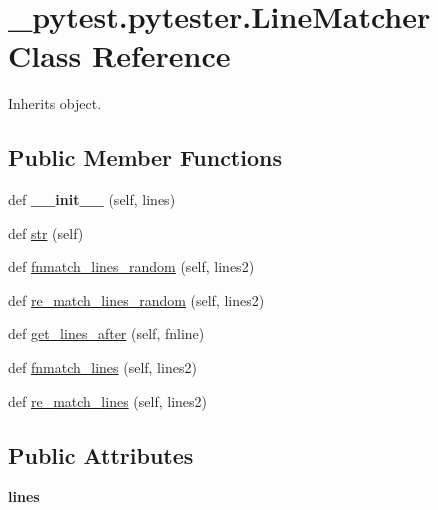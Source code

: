 \hypertarget{class__pytest_1_1pytester_1_1_line_matcher}{}\section{\+\_\+pytest.\+pytester.\+Line\+Matcher Class Reference}
\label{class__pytest_1_1pytester_1_1_line_matcher}


Inherits object.

\subsection*{Public Member Functions}
\begin{DoxyCompactItemize}
\item 
\mbox{\label{class__pytest_1_1pytester_1_1_line_matcher_ab7cbaaa0454579bf7e06a7a2b55272c2}} 
def {\bfseries \+\_\+\+\_\+init\+\_\+\+\_\+} (self, lines)
\item 
def \hyperlink{class__pytest_1_1pytester_1_1_line_matcher_ad1ec0a52963a0ebf982d5a2ff1e8856b}{str} (self)
\item 
def \hyperlink{class__pytest_1_1pytester_1_1_line_matcher_a77606dd9fd900b4863c766c5f640ba27}{fnmatch\+\_\+lines\+\_\+random} (self, lines2)
\item 
def \hyperlink{class__pytest_1_1pytester_1_1_line_matcher_a7cb3221f2ab7309da2342bb23257fc46}{re\+\_\+match\+\_\+lines\+\_\+random} (self, lines2)
\item 
def \hyperlink{class__pytest_1_1pytester_1_1_line_matcher_a2841f2333c328cbd7b48ec18ce60baae}{get\+\_\+lines\+\_\+after} (self, fnline)
\item 
def \hyperlink{class__pytest_1_1pytester_1_1_line_matcher_a114cc37c53d37f961df9f9bf4341d381}{fnmatch\+\_\+lines} (self, lines2)
\item 
def \hyperlink{class__pytest_1_1pytester_1_1_line_matcher_abfacaa8b4c4e97ec60df7b299126389e}{re\+\_\+match\+\_\+lines} (self, lines2)
\end{DoxyCompactItemize}
\subsection*{Public Attributes}
\begin{DoxyCompactItemize}
\item 
\mbox{\label{class__pytest_1_1pytester_1_1_line_matcher_acc548c20380063e91aac9a04e7641d0f}} 
{\bfseries lines}
\end{DoxyCompactItemize}


